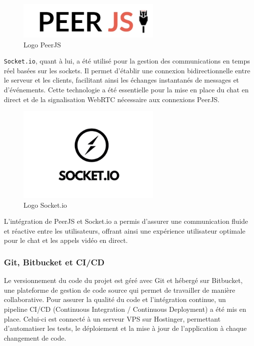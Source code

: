 \vspace{0.35cm}

\begin{figure}[H]
\begin{center}
\includegraphics[width=7cm]{assets/presentation/peer-js.jpeg}
\end{center}
\caption{Logo PeerJS}
\end{figure}

\verb|Socket.io|, quant à lui, a été utilisé pour la gestion des communications en temps réel basées sur les sockets. Il permet d'établir une connexion bidirectionnelle entre le serveur et les clients, facilitant ainsi les échanges instantanés de messages et d'événements. Cette technologie a été essentielle pour la mise en place du chat en direct et de la signalisation WebRTC nécessaire aux connexions PeerJS.  

\vspace{0.35cm}

\begin{figure}[H]
\begin{center}
\includegraphics[width=7cm]{assets/presentation/socketio.png}
\end{center}
\caption{Logo Socket.io}
\end{figure}

L'intégration de PeerJS et Socket.io a permis d'assurer une communication fluide et réactive entre les utilisateurs, offrant ainsi une expérience utilisateur optimale pour le chat et les appels vidéo en direct.  

\subsubsection*{Git, Bitbucket et CI/CD}
Le versionnement du code du projet est géré avec Git et hébergé sur Bitbucket, une plateforme de gestion de code source qui permet de travailler de manière collaborative. Pour assurer la qualité du code et l'intégration continue, un pipeline CI/CD (Continuous Integration / Continuous Deployment) a été mis en place. Celui-ci est connecté à un serveur VPS sur Hostinger, permettant d’automatiser les tests, le déploiement et la mise à jour de l’application à chaque changement de code.

